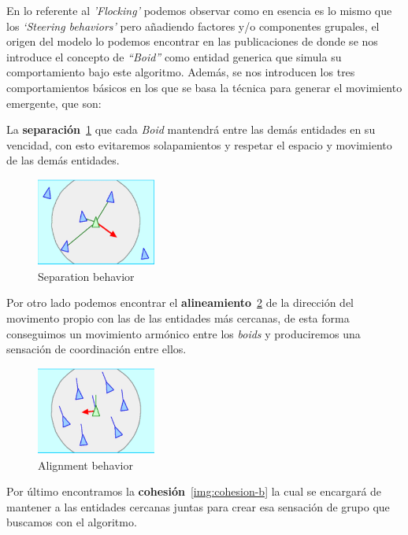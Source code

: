 En lo referente al \textit{'Flocking'} podemos observar como en esencia es lo mismo que
los \textit{`Steering behaviors'} pero añadiendo factores y/o componentes grupales,
el origen del modelo lo podemos encontrar en las publicaciones de \cite{Boids1986} donde
se nos introduce el concepto de \textit{``Boid''} como entidad generica que simula su
comportamiento bajo este algoritmo. Además, se nos introducen los tres comportamientos
básicos en los que se basa la técnica para generar el movimiento emergente, que son:

La \textbf{separación}~\ref{img:separation-b} que cada \textit{Boid} mantendrá entre
las demás entidades en su vencidad, con esto evitaremos solapamientos y respetar el
espacio y movimiento de las demás entidades.

\begin{figure}[ht]
\centering
\includegraphics[width=0.35\textwidth]{imagenes/marco_teo/separation.png}
\caption{Separation behavior}
\label{img:separation-b}
\end{figure}

Por otro lado podemos encontrar el \textbf{alineamiento}~\ref{img:alignment-b} de la
dirección del movimento propio con las de las entidades más cercanas, de esta forma conseguimos un
movimiento armónico entre los \textit{boids} y produciremos una sensación de
coordinación entre ellos.

\begin{figure}[ht]
\centering
\includegraphics[width=0.35\textwidth]{imagenes/marco_teo/alignment.png}
\caption{Alignment behavior}
\label{img:alignment-b}
\end{figure}

Por último encontramos la \textbf{cohesión}~\ref{img:cohesion-b} la cual se encargará de
mantener a las entidades cercanas juntas para crear esa sensación de grupo que buscamos
con el algoritmo.

